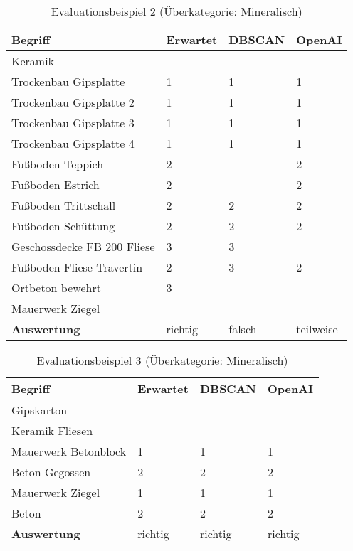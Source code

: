 \begin{table}[h]
	
	\centering
	\begin{tabular}{|l|l|l|l|}
		\hline
		\textbf{Begriff} & \textbf{Erwartet} & \textbf{DBSCAN} & \textbf{OpenAI}\\ \hline
		 Keramik & ~ & ~ & ~ \\ \hline
		 Trockenbau Gipsplatte & 1 & 1 & 1 \\ \hline
		 Trockenbau Gipsplatte 2 & 1 & 1 & 1 \\ \hline
		 Trockenbau Gipsplatte 3 & 1 & 1 & 1 \\ \hline
		 Trockenbau Gipsplatte 4 & 1 & 1 & 1 \\ \hline
		 Fußboden Teppich & 2 & ~ & 2 \\ \hline
		 Fußboden Estrich & 2 & ~ & 2 \\ \hline
		 Fußboden Trittschall & 2 & 2 & 2 \\ \hline
		 Fußboden Schüttung & 2 & 2 & 2 \\ \hline
		 Geschossdecke FB 200 Fliese & 3 & 3 & ~ \\ \hline
		 Fußboden Fliese Travertin & 2 & 3 & 2 \\ \hline
		 Ortbeton bewehrt & 3 & ~ & ~ \\ \hline
		 Mauerwerk Ziegel \\ \hline
		\textbf{Auswertung} & richtig & falsch & teilweise \\ \hline
	\end{tabular}
	\caption{Evaluationsbeispiel 2 (Überkategorie: Mineralisch)}
	\label{t:evaluation-example2}
\end{table}

\begin{table}[h]
	
	\centering
	\begin{tabular}{|l|l|l|l|}
		\hline
		\textbf{Begriff} & \textbf{Erwartet} & \textbf{DBSCAN} & \textbf{OpenAI}\\ \hline
      	Gipskarton & ~ & ~ & ~ \\ \hline
		Keramik Fliesen & ~ & ~ & ~ \\ \hline
		Mauerwerk Betonblock & 1 & 1 & 1 \\ \hline
		Beton Gegossen & 2 & 2 & 2 \\ \hline
		Mauerwerk Ziegel & 1 & 1 & 1 \\ \hline
		Beton & 2 & 2 & 2 \\ \hline	
		\textbf{Auswertung} & richtig & richtig & richtig \\ \hline
	\end{tabular}
	\caption{Evaluationsbeispiel 3 (Überkategorie: Mineralisch)}
	\label{t:evaluation-example3}
\end{table}

